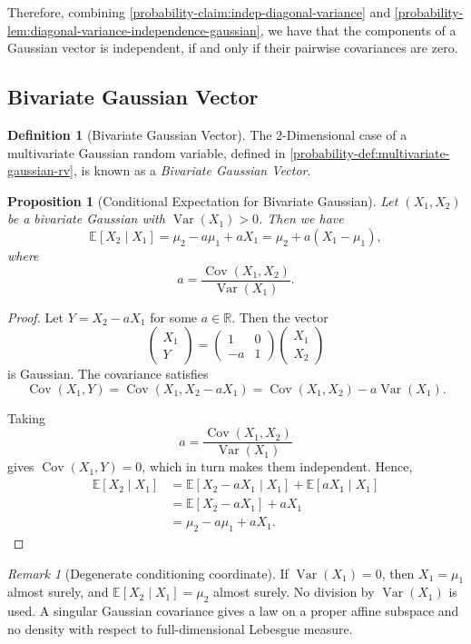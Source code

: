 \documentclass[11pt]{article}
\numberwithin{equation}{section}
\newtheorem{proposition}[theorem]{Proposition}
\theoremstyle{definition}
\newtheorem{definition}[theorem]{Definition}
\theoremstyle{remark}
\newtheorem{remark}[theorem]{Remark}
\newcommand{\pqty}[1]{\left(#1\right)}
\newcommand{\bqty}[1]{\left[#1\right]}
\newcommand{\RR}{\mathbb R}
\newcommand{\Expt}{\mathbb E}
\DeclareMathOperator{\Var}{Var}
\DeclareMathOperator{\Cov}{Cov}
\newcommand{\Conditional}[2]{#1\mid #2}
\newcommand{\pmqty}[1]{\begin{pmatrix}#1\end{pmatrix}}
\begin{document}
Therefore, combining \autoref{probability-claim:indep-diagonal-variance} and \autoref{probability-lem:diagonal-variance-independence-gaussian}, we have that the components of a Gaussian vector is independent, if and only if their pairwise covariances are zero.

\subsection{Bivariate Gaussian Vector}

\begin{definition}[Bivariate Gaussian Vector]\label{probability-definition-067}
    \label{probability-def:bivariate-gaussian-vector}%
    The 2-Dimensional case of a multivariate Gaussian random variable, defined in \autoref{probability-def:multivariate-gaussian-rv}, is known as a \emph{Bivariate Gaussian Vector}.
\end{definition}

\begin{proposition}[Conditional Expectation for Bivariate Gaussian]\label{probability-proposition-044}
    Let \(\pqty{X_1, X_2}\) be a bivariate Gaussian with \(\Var(X_1)>0\). Then we have
    \[
        \Expt\bqty{\Conditional{X_2}{X_1}} = \mu_2 - a \mu_1 + a X_1 = \mu_2 + a \pqty{X_1 - \mu_1},
    \]
    where
    \[
        a = \frac{\Cov\pqty{X_1, X_2}}{\Var\pqty{X_1}}.
    \]
\end{proposition}


\begin{proof}\label{probability-proof-087}
    Let \(Y = X_2 - a X_1\) for some \(a \in \RR\). Then the vector
    \[
        \pmqty{X_1 \\ Y}
        =
        \pmqty{
            1 & 0 \\
            -a & 1
        }
        \pmqty{X_1 \\ X_2}
    \]
    is Gaussian. The covariance satisfies
    \[
        \Cov\pqty{X_1, Y} = \Cov\pqty{X_1, X_2 - a X_1} = \Cov\pqty{X_1, X_2} - a \Var\pqty{X_1}.
    \]
    
    Taking
    \[
        a = \frac{\Cov\pqty{X_1, X_2}}{\Var\pqty{X_1}}
    \]
    gives \(\Cov\pqty{X_1, Y} = 0\), which in turn makes them independent. Hence,
    \begin{align*}
        \Expt\bqty{\Conditional{X_2}{X_1}} &= \Expt\bqty{\Conditional{X_2 - a X_1}{X_1}} + \Expt\bqty{\Conditional{a X_1}{X_1}} \\
        &= \Expt\bqty{X_2 - a X_1} + a X_1 \\
        &= \mu_2 - a \mu_1 + a X_1.
    \end{align*}
\end{proof}
\begin{remark}[Degenerate conditioning coordinate]\label{probability-remark-010}
If \(\Var(X_1)=0\), then \(X_1=\mu_1\) almost surely, and
\(\Expt[X_2\mid X_1]=\mu_2\) almost surely. No division by \(\Var(X_1)\) is used.
A singular Gaussian covariance gives a law on a proper affine subspace and
no density with respect to full-dimensional Lebesgue measure.
\end{remark}
\end{document}
